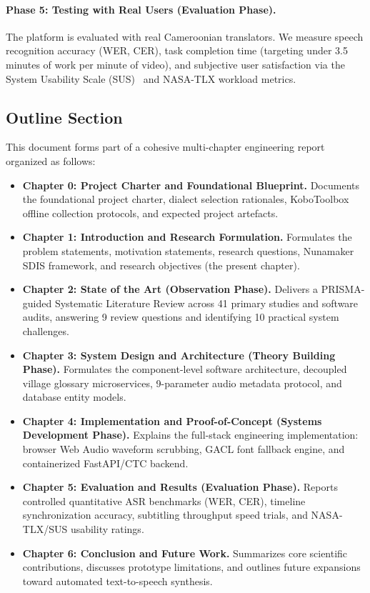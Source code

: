 \documentclass[a4paper,11pt]{article}
\begin{document}
\paragraph{Phase 5: Testing with Real Users (Evaluation Phase).}
The platform is evaluated with real Cameroonian translators. We measure speech recognition accuracy (WER, CER), task completion time (targeting under 3.5 minutes of work per minute of video), and subjective user satisfaction via the System Usability Scale (SUS)~\cite{brooke1996sus} and NASA-TLX workload metrics.

\subsection{Outline Section}
\label{sec:chap1_outline}

This document forms part of a cohesive multi-chapter engineering report organized as follows:
\begin{itemize}
    \item \textbf{Chapter 0: Project Charter and Foundational Blueprint.} Documents the foundational project charter, dialect selection rationales, KoboToolbox offline collection protocols, and expected project artefacts.
    \item \textbf{Chapter 1: Introduction and Research Formulation.} Formulates the problem statements, motivation statements, research questions, Nunamaker SDIS framework, and research objectives (the present chapter).
    \item \textbf{Chapter 2: State of the Art (Observation Phase).} Delivers a PRISMA-guided Systematic Literature Review across 41 primary studies and software audits, answering 9 review questions and identifying 10 practical system challenges.
    \item \textbf{Chapter 3: System Design and Architecture (Theory Building Phase).} Formulates the component-level software architecture, decoupled village glossary microservices, 9-parameter audio metadata protocol, and database entity models.
    \item \textbf{Chapter 4: Implementation and Proof-of-Concept (Systems Development Phase).} Explains the full-stack engineering implementation: browser Web Audio waveform scrubbing, GACL font fallback engine, and containerized FastAPI/CTC backend.
    \item \textbf{Chapter 5: Evaluation and Results (Evaluation Phase).} Reports controlled quantitative ASR benchmarks (WER, CER), timeline synchronization accuracy, subtitling throughput speed trials, and NASA-TLX/SUS usability ratings.
    \item \textbf{Chapter 6: Conclusion and Future Work.} Summarizes core scientific contributions, discusses prototype limitations, and outlines future expansions toward automated text-to-speech synthesis.
\end{itemize}
\end{document}
